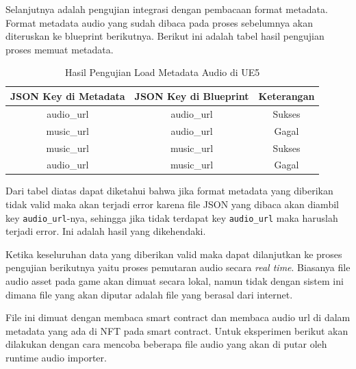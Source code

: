 Selanjutnya adalah pengujian integrasi dengan pembacaan format metadata. Format metadata audio yang sudah dibaca pada proses sebelumnya akan diteruskan ke blueprint berikutnya.
Berikut ini adalah tabel hasil pengujian proses memuat metadata.

\begin{longtable}{|c|c|c|}
  \caption{Hasil Pengujian Load Metadata Audio di UE5}
  \label{tb:UjiIntegrasiPengujianLoadMetadataAudio}                                    \\
  \hline
  \rowcolor[HTML]{C0C0C0}
  \textbf{JSON Key di Metadata} & \textbf{JSON Key di Blueprint} & \textbf{Keterangan} \\
  \hline
  audio\_url                    & audio\_url                     & Sukses              \\
  music\_url                    & audio\_url                     & Gagal               \\
  music\_url                    & music\_url                     & Sukses              \\
  audio\_url                    & music\_url                     & Gagal              \\
  \hline
\end{longtable}

Dari tabel diatas dapat diketahui bahwa jika format metadata yang diberikan tidak valid maka akan terjadi error karena file JSON yang dibaca
akan diambil key \texttt{audio\_url}-nya, sehingga jika tidak terdapat key \texttt{audio\_url} maka haruslah terjadi error. Ini adalah hasil yang dikehendaki.

Ketika keseluruhan data yang diberikan valid maka dapat dilanjutkan ke proses pengujian berikutnya yaitu proses pemutaran audio secara \emph{real time}.
Biasanya file audio asset pada game akan dimuat secara lokal, namun tidak dengan sistem ini dimana file yang akan diputar adalah file yang berasal dari internet.

File ini dimuat dengan membaca smart contract dan membaca audio url di dalam metadata yang ada di NFT pada smart contract. Untuk eksperimen berikut akan dilakukan
dengan cara mencoba beberapa file audio yang akan di putar oleh runtime audio importer.

